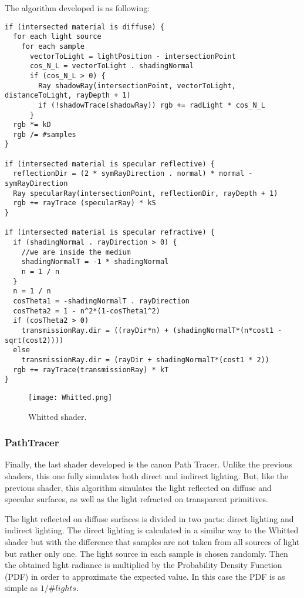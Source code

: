 \par
The algorithm developed is as following:

\begin{lstlisting}
if (intersected material is diffuse) {
  for each light source
    for each sample
      vectorToLight = lightPosition - intersectionPoint
      cos_N_L = vectorToLight . shadingNormal
      if (cos_N_L > 0) {
        Ray shadowRay(intersectionPoint, vectorToLight, distanceToLight, rayDepth + 1)
        if (!shadowTrace(shadowRay)) rgb += radLight * cos_N_L
      }
  rgb *= kD
  rgb /= #samples
}

if (intersected material is specular reflective) {
  reflectionDir = (2 * symRayDirection . normal) * normal - symRayDirection
  Ray specularRay(intersectionPoint, reflectionDir, rayDepth + 1)
  rgb += rayTrace (specularRay) * kS
}

if (intersected material is specular refractive) {
  if (shadingNormal . rayDirection > 0) {
    //we are inside the medium
    shadingNormalT = -1 * shadingNormal
    n = 1 / n
  }
  n = 1 / n
  cosTheta1 = -shadingNormalT . rayDirection
  cosTheta2 = 1 - n^2*(1-cosTheta1^2)
  if (cosTheta2 > 0)
    transmissionRay.dir = ((rayDir*n) + (shadingNormalT*(n*cost1 - sqrt(cost2))))
  else
    transmissionRay.dir = (rayDir + shadingNormalT*(cost1 * 2))
  rgb += rayTrace(transmissionRay) * kT
}
\end{lstlisting}

\begin{figure}[H]
	\centering
	\caption{Whitted shader.}
	\label{Whitted shader.}
	\texttt{[image: Whitted.png]}
\end{figure}


\subsubsection{PathTracer}

\par
Finally, the last shader developed is the canon Path Tracer.
Unlike the previous shaders, this one fully simulates both direct and indirect lighting.
But, like the previous shader, this algorithm simulates the light reflected on diffuse and specular surfaces, as well as the light refracted on transparent primitives.

\par
The light reflected on diffuse surfaces is divided in two parts: direct lighting and indirect lighting.
The direct lighting is calculated in a similar way to the Whitted shader but with the difference that samples are not taken from all sources of light but rather only one.
The light source in each sample is chosen randomly.
Then the obtained light radiance is multiplied by the Probability Density Function (PDF) in order to approximate the expected value.
In this case the PDF is as simple as
$1 / \#lights$.

